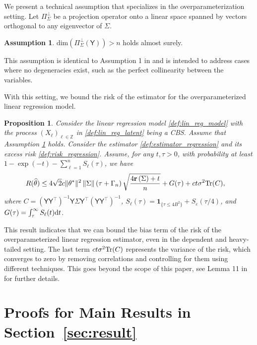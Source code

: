 \documentclass[11pt,a4paper]{article}
\newtheorem{proposition}[theorem]{Proposition}
\theoremstyle{remark}
\theoremstyle{definition}
\newtheorem{assumption}{Assumption}
\theoremstyle{definition}
\renewcommand{\hat}{\widehat}
\newcommand{\Surv}{S}
\newcommand{\rc}{\color{black}}
\begin{document}
\begin{bibunit}[apalike]
We present a technical assumption that specializes in the overparameterization setting.
Let $\Pi_\Sigma^{\perp}$ be a projection operator onto a linear space spanned by vectors orthogonal to any eigenvector of $\Sigma$.
\begin{assumption} \label{asmp:design_matrix_z}
$\mathrm{dim}(\Pi_\Sigma^\perp (\mathsf{Y}) ) > n $ holds almost surely.
\end{assumption}
This assumption is identical to Assumption 1 in \citep{bartlett2020benign} and is intended to address cases where no degeneracies exist, such as the perfect {\rc collinearity} between the variables. 



With this setting, we bound the risk of the estimator for the overparameterized linear regression model.

\begin{proposition} \label{prop:over_param}
Consider the linear regression model \eqref{def:lin_reg_model} with the process $(X_\ell)_{\ell \in \mathbb{Z}}$ in \eqref{def:lin_reg_latent} being a CBS.
Assume that Assumption  \ref{asmp:design_matrix_z} holds.
Consider the estimator \eqref{def:estimator_regression} and its excess risk \eqref{def:risk_regression}.
Assume, for any $t,\tau > 0$, with probability at least $1-\exp(-t)- \sum_{\ell=1}^n \Surv_\ell(\tau)$, we have
\begin{align*}
    R(\hat{\theta}) &\leq  { 4}\sqrt{2} c \|\theta^*\|^2\left\|\Sigma\right\| \left({\tau+\Gamma_{n}}\right)\sqrt{\frac{4\mathbf{r}\left(\Sigma\right)+t}{n}} + G(\tau) + ct \sigma^2 \mathrm{\rc Tr}(C),
\end{align*}
where $C = (\mathsf{Y} \mathsf{Y}^\top)^{-1} \mathsf{Y} \Sigma \mathsf{Y}^\top (\mathsf{Y} \mathsf{Y}^\top)^{-1}$, $\Surv_\ell(\tau) =  \mathbf{1}_{\{\tau \leq 4B^2\}} +  \Surv_\varepsilon(\tau/4)$, and $G(\tau) = \int_{\tau}^{\infty} \Surv_\ell(t) {\rm d}t$.
\end{proposition}
This result indicates that we can bound the bias term of the risk of the overparameterized linear regression estimator, even in the dependent and heavy-tailed setting. 
The last term $ct \sigma^2 \mathrm{\rc Tr}(C)$ represents the variance of the risk, which converges to zero by removing correlations and controlling for them using different techniques. 
This goes beyond the scope of this paper, see Lemma 11 in \citep{bartlett2020benign} for further details. 




\section{Proofs for Main Results in Section~\ref{sec:result}}\label{sec:proof}






\end{bibunit}
\end{document}
